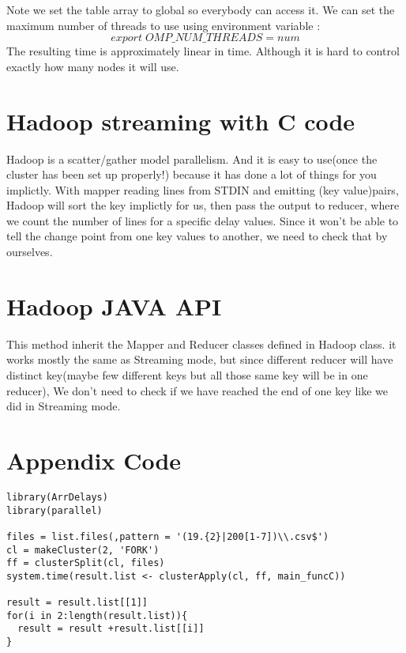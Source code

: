 \documentclass[11pt]{article}
\begin{document}
Note we set the table array to global so everybody can access it. We can set the maximum number of threads to use using environment variable :
\[export \; OMP\_NUM\_THREADS= num \]
The resulting time is approximately linear in time. Although it is hard to control exactly how many nodes it will use.
\section{Hadoop streaming with C code}
Hadoop is a scatter/gather model parallelism. And it is easy to use(once the cluster has been set up properly!) because it has done a lot of things for you implictly. With mapper reading lines from STDIN and emitting (key value)pairs, Hadoop will sort the key implictly for us, then pass the output to reducer, where we count the number of lines for a specific delay values. Since it won't be able to tell the change point from one key values to another, we need to check that by ourselves. 

\section{Hadoop JAVA API}
This method inherit the Mapper and Reducer classes defined in Hadoop class. it works mostly the same as Streaming mode, but since different reducer will have distinct key(maybe few different keys but all those same key will be in one reducer), We don't need to check if we have reached the end of one key like we did in Streaming mode.

\section{Appendix Code}
\lstset{language=R}
\begin{lstlisting}[frame=single]
library(ArrDelays)
library(parallel)

files = list.files(,pattern = '(19.{2}|200[1-7])\\.csv$')
cl = makeCluster(2, 'FORK')
ff = clusterSplit(cl, files)
system.time(result.list <- clusterApply(cl, ff, main_funcC))

result = result.list[[1]]
for(i in 2:length(result.list)){
  result = result +result.list[[i]]
}
\end{lstlisting}
\end{document}
